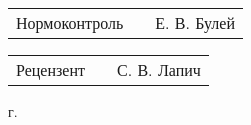\documentclass[a4paper]{article}
\begin{document}
\begin{FlushLeft}
{  \vspace{14pt}

  \begin{tabular}{p{6.5cm} p{4.767cm} p{5.633cm}}
    \raggedleft Нормоконтроль & & Е. В. Булей \\
  \end{tabular}

  \vspace{14pt}

  \begin{tabular}{p{6.5cm} p{4.767cm} p{5.633cm}}
    \raggedleft Рецензент & & С. В. Лапич \\
  \end{tabular}
  
}\end{FlushLeft}

\begin{Center}{
\cyrillicfontsf 
\englishfontsf
\fontsize{14pt}{21pt} г.
}\end{Center}
\end{document}
